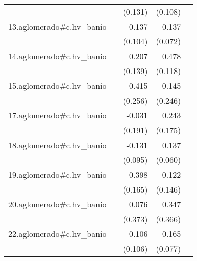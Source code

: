 {\begin{longtable}{l*{4}{D{.}{.}{-1}}}
            &                     &     (0.131)         &     (0.108)         &                     \\
\addlinespace
13.aglomerado#c.hv\_banio&                     &      -0.137         &       0.137         &                     \\
            &                     &     (0.104)         &     (0.072)         &                     \\
\addlinespace
14.aglomerado#c.hv\_banio&                     &       0.207         &       0.478\sym{***}&                     \\
            &                     &     (0.139)         &     (0.118)         &                     \\
\addlinespace
15.aglomerado#c.hv\_banio&                     &      -0.415         &      -0.145         &                     \\
            &                     &     (0.256)         &     (0.246)         &                     \\
\addlinespace
17.aglomerado#c.hv\_banio&                     &      -0.031         &       0.243         &                     \\
            &                     &     (0.191)         &     (0.175)         &                     \\
\addlinespace
18.aglomerado#c.hv\_banio&                     &      -0.131         &       0.137\sym{*}  &                     \\
            &                     &     (0.095)         &     (0.060)         &                     \\
\addlinespace
19.aglomerado#c.hv\_banio&                     &      -0.398\sym{*}  &      -0.122         &                     \\
            &                     &     (0.165)         &     (0.146)         &                     \\
\addlinespace
20.aglomerado#c.hv\_banio&                     &       0.076         &       0.347         &                     \\
            &                     &     (0.373)         &     (0.366)         &                     \\
\addlinespace
22.aglomerado#c.hv\_banio&                     &      -0.106         &       0.165\sym{*}  &                     \\
            &                     &     (0.106)         &     (0.077)         &                     \\

\end{longtable}}
